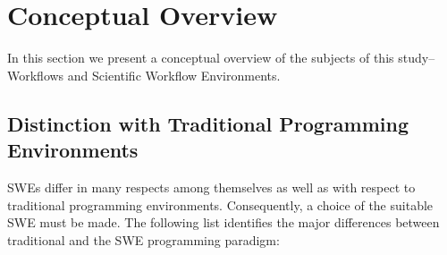 \section{Conceptual Overview}
In this section we present a conceptual overview of the subjects of this
study--Workflows and Scientific Workflow Environments.

\subsection{Distinction with Traditional Programming Environments}
SWEs differ in many respects among themselves as well as with respect to traditional
programming environments. Consequently, a choice of the suitable SWE must be
made. The following list identifies the major differences
between traditional and the SWE programming paradigm:

